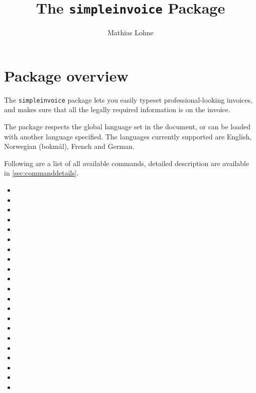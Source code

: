 \documentclass[a4paper, article, oneside, USenglish, hidelinks]{memoir}
\title{The \texttt{simpleinvoice} Package}
\author{Mathias Lohne}
\date{}
\begin{document}
\maketitle

\tableofcontents

\newpage
\chapter{Package overview}
The \texttt{simpleinvoice} package lets you easily typeset professional-looking invoices, and makes sure that all the legally required information is on the invoice.

The package respects the global language set in the document, or can be loaded with another language specified. The languages currently supported are English, Norwegian (bokmål), French and German.


Following are a list of all available commands, detailed description are available in \cref{sec:commanddetails}.

\begin{itemize}
	\item {}
	\item {}
	\item {}
	\item {}
	\item {}
	\item {}
	\item {}
	\item {}
	\item {}
	\item {}
	\item {}
	\item {}
	\item {}
	\item {}
	\item {}
	\item {}
	\item {}
	\item {}
	\item {}
	\item {}
	\item {}
\end{itemize}
\end{document}

